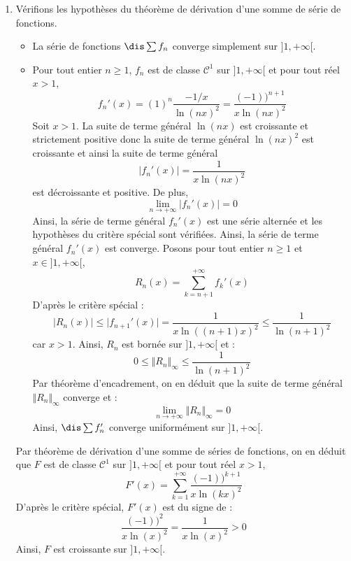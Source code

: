 \documentclass[a4paper,10pt]{report}
\begin{document}
\begin{enumerate}
\medskip

\noindent $\rhd$ Pour tout $x \in ]1, + \infty[$,
$$ F(x) = - \dfrac{1}{\ln(x)} + \sum_{n=2}^{+ \infty} f_n(x)$$
La série $\sum_{n \geq 2} f_n$ converge uniformément sur $]1, + \infty[$ donc $1$ est une extrémité. Pour tout $n \geq 2$,
$$ \lim_{x \rightarrow 1} f_n(x) = \dfrac{(-1)^n}{\ln(n)}$$
Par théorème d'interversion limite/somme, on en déduit que la somme de $\sum_{n \geq 2} f_n$ admet une limite finie en $1^+$ valant :
$$ \sum_{n=2}^{+ \infty} \dfrac{(-1)^n}{\ln(n)}$$
Ainsi, $x \mapsto F(x) + \dfrac{1}{\ln(x)}$ admet une limite finie quand $x$ tend vers $1^+$. Or :
$$ \lim_{x \rightarrow 1^+} \dfrac{1}{\ln(x)} = + \infty$$
On en déduit que $F$ admet pour limite $- \infty$ en $1^{+}$ (par somme d'une fonction ayant cette limite et d'une fonction admettant une limite finie).
\item Vérifions les hypothèses du théorème de dérivation d'une somme de série de fonctions.
\begin{itemize}
\item La série de fonctions $\dis \sum f_n$ converge simplement sur $]1, + \infty[$.
\item Pour tout entier $n \geq 1$, $f_n$ est de classe $\mathcal{C}^1$ sur $]1, + \infty[$ et pour tout réel $x>1$,
$$ f_n'(x) = (1)^n \dfrac{-1/x}{\ln(nx)^2} = \dfrac{(-1))^{n+1}}{x \ln(nx)^2}$$
Soit $x>1$. La suite de terme général $\ln(nx)$ est croissante et strictement positive donc la suite de terme général $\ln(nx)^2$ est croissante et ainsi la suite de terme général 
$$ \vert f_n'(x) \vert = \dfrac{1}{x \ln(nx)^2}$$
est décroissante et positive. De plus,
$$ \lim_{n \rightarrow + \infty} \vert f_n'(x) \vert = 0$$
Ainsi, la série de terme général $f_n'(x)$ est une série alternée et les hypothèses du critère spécial sont vérifiées. Ainsi, la série de terme général $f_n'(x)$ est converge. Posons pour tout entier $n \geq 1$ et $x \in ]1, + \infty[$,
$$ R_n(x) = \sum_{k=n+1}^{+ \infty} f_k'(x)$$
D'après le critère spécial :
$$ \vert R_n(x) \vert \leq \vert f_{n+1}'(x) \vert = \dfrac{1}{x \ln((n+1)x)^2} \leq \dfrac{1}{\ln(n+1)^2}$$
car $x>1$. Ainsi, $R_n$ est bornée sur $]1, + \infty[$ et :
$$ 0 \leq \Vert R_n \Vert_{\infty} \leq \dfrac{1}{\ln(n+1)^2}$$
Par théorème d'encadrement, on en déduit que la suite de terme général $\Vert R_n \Vert_{\infty}$ converge et :
$$ \lim_{n \rightarrow + \infty} \Vert R_n \Vert_{\infty} = 0$$
Ainsi, $\dis \sum f_n'$ converge uniformément sur $]1, + \infty[$.
\end{itemize}
Par théorème de dérivation d'une somme de séries de fonctions, on en déduit que $F$ est de classe $\mathcal{C}^1$ sur $]1, + \infty[$ et pour tout réel $x>1$,
$$ F'(x) = \sum_{k=1}^{+ \infty} \dfrac{(-1))^{k+1}}{x \ln(kx)^2}$$
D'après le critère spécial, $F'(x)$ est du signe de :
$$ \dfrac{(-1))^{2}}{x \ln(x)^2} = \dfrac{1}{x \ln(x)^2}>0$$
Ainsi, $F$ est croissante sur $]1, + \infty[$.


\end{enumerate}
\end{document}
